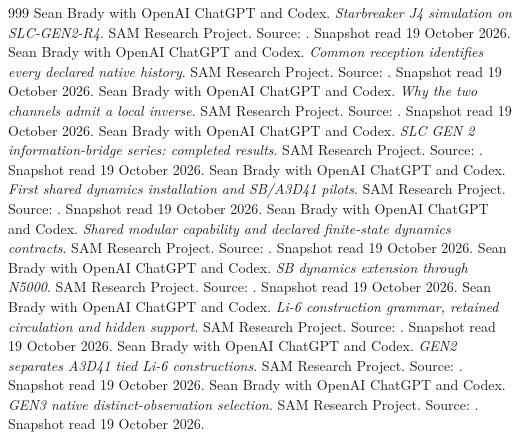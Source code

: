 \begingroup\small
\renewcommand{\refname}{Repository sources for the expansion}
\begin{thebibliography}{999}
 Sean Brady with OpenAI ChatGPT and Codex. \emph{Starbreaker J4 simulation on SLC-GEN2-R4}. SAM Research Project. Source: . Snapshot read 19 October 2026.
 Sean Brady with OpenAI ChatGPT and Codex. \emph{Common reception identifies every declared native history}. SAM Research Project. Source: . Snapshot read 19 October 2026.
 Sean Brady with OpenAI ChatGPT and Codex. \emph{Why the two channels admit a local inverse}. SAM Research Project. Source: . Snapshot read 19 October 2026.
 Sean Brady with OpenAI ChatGPT and Codex. \emph{SLC GEN 2 information-bridge series: completed results}. SAM Research Project. Source: . Snapshot read 19 October 2026.
 Sean Brady with OpenAI ChatGPT and Codex. \emph{First shared dynamics installation and SB/A3D41 pilots}. SAM Research Project. Source: . Snapshot read 19 October 2026.
 Sean Brady with OpenAI ChatGPT and Codex. \emph{Shared modular capability and declared finite-state dynamics contracts}. SAM Research Project. Source: . Snapshot read 19 October 2026.
 Sean Brady with OpenAI ChatGPT and Codex. \emph{SB dynamics extension through N5000}. SAM Research Project. Source: . Snapshot read 19 October 2026.
 Sean Brady with OpenAI ChatGPT and Codex. \emph{Li-6 construction grammar, retained circulation and hidden support}. SAM Research Project. Source: . Snapshot read 19 October 2026.
 Sean Brady with OpenAI ChatGPT and Codex. \emph{GEN2 separates A3D41 tied Li-6 constructions}. SAM Research Project. Source: . Snapshot read 19 October 2026.
 Sean Brady with OpenAI ChatGPT and Codex. \emph{GEN3 native distinct-observation selection}. SAM Research Project. Source: . Snapshot read 19 October 2026.

\end{thebibliography}
